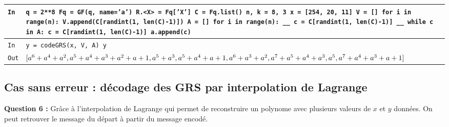 \documentclass[titlepage]{article}
\begin{document}
        \begin{tabularx}{12cm}{|p{0.60cm}|X|}
            \hline
            \rowcolor{gray}
            \texttt{In}
            & 
            \texttt{q = 2**8\newline
            Fq = GF(q, name='a')\newline
            R.<X> = Fq['X']\newline
            C = Fq.list()\newline
            n, k = 8, 3\newline
            \newline
            x = [254, 20, 11]\newline
            \newline
            V = []\newline
            for i in range(n):\newline
            V.append(C[randint(1, len(C)-1)])\newline
            \newline
            A = []\newline
            for i in range(n): \newline
            \_\_ c = C[randint(1, len(C)-1)]\newline
            \_\_ while c in A:
            c = C[randint(1, len(C)-1)]\newline
            a.append(c)}
            \\
            \hline
            \rowcolor{gray}
            \texttt{In}
            & 
            \texttt{y = codeGRS(x, V, A)\newline
            y}
            \\
            \hline
            \texttt{Out}
            &
            \texttt{$[a^6 + a^4 + a^2,\newline
            a^5 + a^4 + a^3 + a^2 + a + 1,\newline
            a^5 + a^3,\newline
            a^5 + a^4 + a + 1,\newline
            a^6 + a^3 + a^2,\newline
            a^7 + a^5 + a^4 + a^3,\newline
            a^5,\newline
            a^7 + a^4 + a^3 + a + 1]$}
            \\
            \hline
        \end{tabularx}
        \bigbreak

        \subsection{Cas sans erreur : décodage des GRS par interpolation de Lagrange}
        \textbf{Question 6 :}
        Grâce à l'interpolation de Lagrange qui permet de reconstruire un polynome avec plusieurs valeurs de $x$ et $y$ données. 
        On peut retrouver le message du départ à partir du message encodé.
\end{document}
